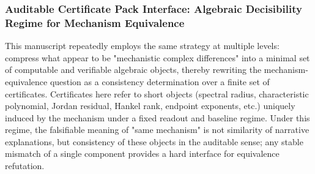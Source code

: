 \subsubsection{Auditable Certificate Pack Interface: Algebraic Decisibility Regime for Mechanism Equivalence}\label{subsubsec:discussion-audit-certificate-pack}
This manuscript repeatedly employs the same strategy at multiple levels: compress what appear to be "mechanistic complex differences" into a minimal set of computable and verifiable algebraic objects, thereby rewriting the mechanism-equivalence question as a consistency determination over a finite set of certificates.
Certificates here refer to short objects (spectral radius, characteristic polynomial, Jordan residual, Hankel rank, endpoint exponents, etc.) uniquely induced by the mechanism under a fixed readout and baseline regime.
Under this regime, the falsifiable meaning of "same mechanism" is not similarity of narrative explanations, but consistency of these objects in the auditable sense; any stable mismatch of a single component provides a hard interface for equivalence refutation.

